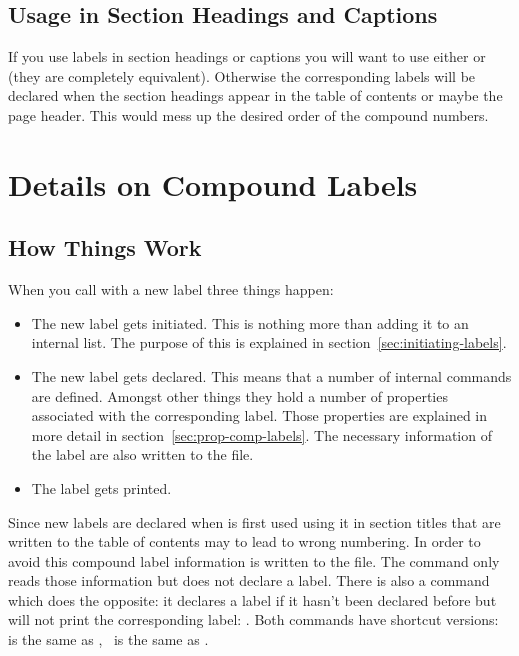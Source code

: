 \documentclass[load-preamble+,babel-options={ngerman,british,american}]{cnltx-doc}
\begin{document}
\subsection{Usage in Section Headings and Captions}\label{sec:usage-sect-head}
If you use labels in section headings or captions you will want to use either
 or \code{+} (they are completely equivalent).  Otherwise
the corresponding labels will be declared when the section headings appear in
the table of contents or maybe the page header.  This would mess up the
desired order of the compound numbers.

\section{Details on Compound Labels}\label{sec:deta-comp-labels}
\subsection{How Things Work}\label{sec:how-things-work}

When you call  with a new label three things happen:
\begin{itemize}
  \item The new label gets initiated.  This is nothing more than adding it to
    an internal list.  The purpose of this is explained in
    section~\ref{sec:initiating-labels}.
  \item The new label gets declared.  This means that a number of internal
    commands are defined.  Amongst other things they hold a number of
    properties associated with the corresponding label.  Those properties are
    explained in more detail in section~\ref{sec:prop-comp-labels}.  The
    necessary information of the label are also written to the 
    file.
  \item The label gets printed.
\end{itemize}

Since new labels are declared when  is first used using it in section
titles that are written to the table of contents may to lead to wrong
numbering.  In order to avoid this compound label information is written to
the  file.  The command 
only reads those information but does not declare a label.  There is also a
command which does the opposite: it declares a label if it hasn't been
declared before but will not print the corresponding label:
.  Both commands have shortcut
versions: \code{+} is the same as , \sarg\ is
the same as .
\end{document}
